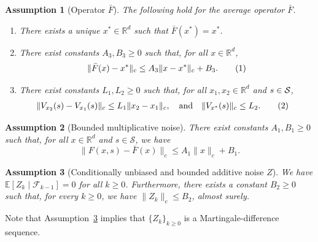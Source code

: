 \documentclass{article}
\newcommand{\numberthis}{\addtocounter{equation}{1}\tag{\theequation}}
\newcommand{\R}{\mathbb{R}}
\newtheorem{assmp}{Assumption}
\begin{document}
\begin{assmp}[Operator $\bar{F}$]\label{assmp:barf} The following hold for the average operator $\bar{F}$.
\begin{enumerate} 
\item There exists a unique $x^* \in \R^d$ such that $\bar{F}(x^*) = x^*$. 
\item There exist constants $A_3,B_3 \geq 0$ such that, for all $x\in \R^d$,
\[ \|\bar{F}(x) - x^*\|_c \le A_3 \|x- x^*\|_c + B_3. \numberthis\label{eq:barfassump} \]   
\item %
There exist constants $L_1,L_2\geq 0$ such that, for all $x_1, x_2 \in \R^d$ and $s\in\cal S$,
    \begin{align*}
        &\|V_{x_2}(s) - V_{x_1}(s)\|_c \le L_1 \|x_2 - x_1\|_c, \quad \text{and} \quad \|V_{x^*}(s)\|_c \le L_2. \numberthis\label{eq:Lipschitzness}
    \end{align*}
\end{enumerate}
\end{assmp}


\begin{assmp}[Bounded multiplicative noise]\label{assmp:boundedmultnoise}
    There exist constants $A_1, B_1 \geq 0$ such that, for all $x\in\mathbb{R}^d$ and $s\in\mathcal{S}$, we have
    \[ \|F(x, s) - \bar{F}(x) \|_c \le A_1 \|x \|_c + B_1. \]
\end{assmp}


\begin{assmp}[Conditionally unbiased and bounded additive noise $Z$]\label{assmp:boundedaddnoise} We have $\mathbb{E}[Z_k\mid \mathcal{F}_{k-1}] = 0$ for all $k\geq 0$. Furthermore, there exists a constant $B_2 \geq 0$ such that, for every $k\geq 0$, we have $\|Z_k \|_c \le B_2$, almost surely.
\end{assmp}

\noindent Note that Assumption~\ref{assmp:boundedaddnoise} implies that $\{Z_k\}_{k\geq 0}$ is a Martingale-difference sequence.
\end{document}
